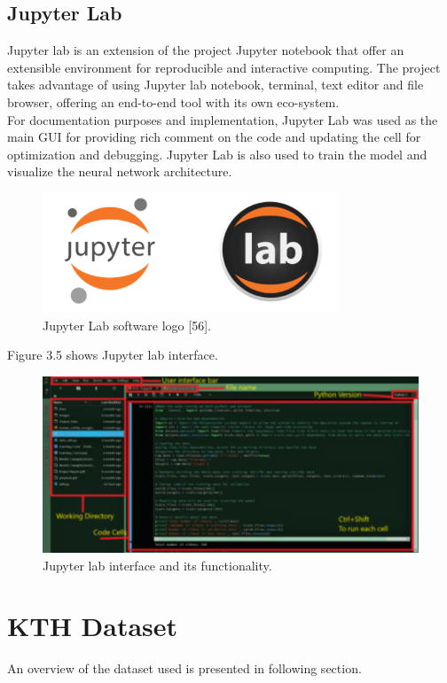 \subsection{Jupyter Lab}
\hspace{5mm} Jupyter lab is an extension of the project Jupyter notebook that offer an extensible environment for reproducible and interactive computing. The project takes advantage of using Jupyter lab notebook, terminal, text editor and file browser, offering an end-to-end tool with its own eco-system.\\

For documentation purposes and implementation, Jupyter Lab was used as the main GUI for providing rich comment on the code and updating the cell for optimization and debugging. Jupyter Lab is also used to train the model and visualize the neural network architecture.
\begin{figure}[ht]
\centering
\includegraphics{Figures/jupyter_lab}
\decoRule
\caption[Jupyter Lab software logo "56".]{Jupyter Lab software logo [56].}
\label{fig:la}
\end{figure}

Figure 3.5 shows Jupyter lab interface.\\
\begin{figure}[ht]
\centering
\includegraphics{Figures/jl1}
\decoRule
\caption[Jupyter lab interface and its functionality.]{Jupyter lab interface and its functionality.}
\label{fig:la}
\end{figure}

\section{KTH Dataset}
\hspace{5mm} An overview of the dataset used is presented in following section.\\

